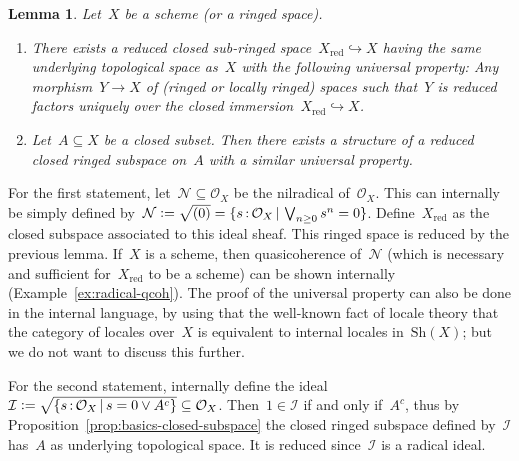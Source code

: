 \documentclass[10pt,reqno,a4paper]{amsbook}
\makeatletter
\theoremstyle{definition}
\theoremstyle{plain}
\newtheorem{lemma}[defn]{Lemma}
\theoremstyle{remark}
\renewcommand{\O}{\mathcal{O}}
\newcommand{\N}{\mathcal{N}}
\newcommand{\I}{\mathcal{I}}
\newcommand{\Sh}{\mathrm{Sh}}
\newcommand{\?}{\,{:}\,}
\renewcommand{\_}{\mathpunct{.}\,}
\newcommand{\XXXh}[1]{}
\newcommand{\defeq}{\vcentcolon=}
\renewenvironment{proof}[1][\proofname]{\par
  \pushQED{\qed}%
  \normalfont \topsep6\p@\@plus6\p@\relax
  \trivlist
  \item[\hskip\labelsep
        \itshape
    #1\@addpunct{.}]\ignorespaces
}{%
  \popQED\endtrivlist\@endpefalse
}
\makeatother
\begin{document}
\begin{lemma}\label{lemma:reduced-subspace}
Let~$X$ be a scheme (or a ringed space).
\begin{enumerate}
\item There exists a reduced closed sub-ringed space~$X_\mathrm{red}
\hookrightarrow X$ having the same underlying topological space as~$X$ with
the following universal property: Any morphism~$Y \to X$
of (ringed or locally ringed) spaces such that~$Y$ is reduced factors uniquely
over the closed immersion~$X_\mathrm{red} \hookrightarrow X$.
\item Let~$A \subseteq X$ be a closed subset. Then there exists a structure of
a reduced closed ringed subspace on~$A$ with a similar universal
property.
\end{enumerate}
\end{lemma}
\begin{proof}For the first statement, let~$\N \subseteq \O_X$ be the nilradical
of~$\O_X$. This can internally be simply defined by~$\N \defeq \sqrt{(0)} = \{
s\?\O_X \,|\, \bigvee_{n \geq 0} s^n = 0 \}$. Define~$X_\mathrm{red}$ as the closed
subspace associated to this ideal sheaf. This ringed space is reduced by the
previous lemma. If~$X$ is a scheme, then quasicoherence of~$\N$ (which is
necessary and sufficient for~$X_\mathrm{red}$ to be a scheme) can be shown
internally (Example~\ref{ex:radical-qcoh}).
The proof of the universal property can also be done in the
internal language, by using that the well-known fact of locale theory that the
category of locales over~$X$ is equivalent to internal locales in~$\Sh(X)$; but
we do not want to discuss this further.

For the second statement, internally define the ideal~$\I \defeq \sqrt{\{ s\?\O_X \,|\, s = 0 \vee
A^c \}} \subseteq \O_X$. Then~$1 \in \I$ if and only if~$A^c$, thus by
Proposition~\ref{prop:basics-closed-subspace} the closed ringed subspace defined
by~$\I$ has~$A$ as underlying topological space. It is reduced since~$\I$ is a
radical ideal. \XXXh{is~$\I$ quasicoherent, if~$X$ is a scheme?}\end{proof}
\end{document}
